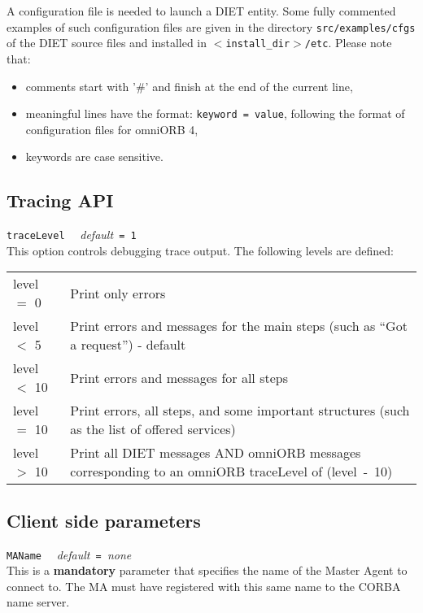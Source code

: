 A configuration file is needed to launch a DIET entity. Some fully
commented examples of such configuration files are given in the
directory \texttt{src/examples/cfgs} of the DIET source files and
installed in \texttt{$<$install\_dir$>$/etc}. Please note that:
\begin{itemize}
\item comments start with '\#' and finish at the end of the current
  line,
\item meaningful lines have the format: \texttt{keyword = value}, following the
  format of configuration files for omniORB 4,
\item keywords are case sensitive.
\end{itemize}

\subsection{Tracing API}

\noindent
\texttt{traceLevel} \ \ \emph{default}\texttt{ = 1}\\
This option controls debugging trace output. The following levels are defined:

\begin{center}
 \footnotesize
 \begin{tabular}{p{.1\linewidth}p{.8\linewidth}}
  level $=$ 0  & Print only errors\\
  level $<$ 5  & Print errors and messages for the main steps (such as ``Got a
  request'') - default\\
  level $<$ 10 & Print errors and messages for all steps\\
  level $=$ 10 & Print errors, all steps, and some important structures (such
  as the list of offered services)\\
  level $>$ 10 & Print all DIET messages AND omniORB messages corresponding to
  an omniORB traceLevel of (level~-~10)
 \end{tabular}
\end{center}


\subsection{Client side parameters}

\noindent
\texttt{MAName} \ \ \emph{default}\texttt{ = }\emph{none}\\
This is a \textbf{mandatory} parameter that specifies the name of the Master
Agent to connect to. The MA must have registered with this same name to the
CORBA name server.


